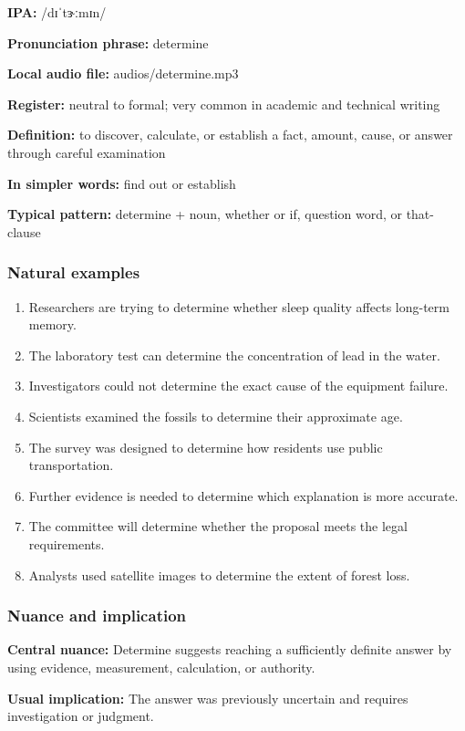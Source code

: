 \documentclass[11pt]{article}
\begin{document}
\textbf{IPA:} /dɪˈtɝːmɪn/

\textbf{Pronunciation phrase:} determine

\textbf{Local audio file:} audios/determine.mp3

\textbf{Register:} neutral to formal; very common in academic and technical writing

\textbf{Definition:} to discover, calculate, or establish a fact, amount, cause, or answer through careful examination

\textbf{In simpler words:} find out or establish

\textbf{Typical pattern:} determine + noun, whether or if, question word, or that-clause

\subsubsection{Natural examples}
\begin{enumerate}
  \item Researchers are trying to determine whether sleep quality affects long-term memory.
  \item The laboratory test can determine the concentration of lead in the water.
  \item Investigators could not determine the exact cause of the equipment failure.
  \item Scientists examined the fossils to determine their approximate age.
  \item The survey was designed to determine how residents use public transportation.
  \item Further evidence is needed to determine which explanation is more accurate.
  \item The committee will determine whether the proposal meets the legal requirements.
  \item Analysts used satellite images to determine the extent of forest loss.
\end{enumerate}

\subsubsection{Nuance and implication}
\textbf{Central nuance:} Determine suggests reaching a sufficiently definite answer by using evidence, measurement, calculation, or authority.

\textbf{Usual implication:} The answer was previously uncertain and requires investigation or judgment.
\end{document}

